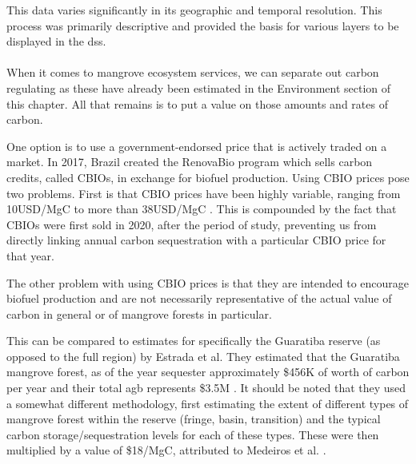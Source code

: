 This data varies significantly in its geographic and temporal resolution. This process was primarily descriptive and provided the basis for various layers to be displayed in the \ac{dss}.

\paragraph{} \leavevmode\newline

When it comes to mangrove ecosystem services, we can separate out carbon regulating as these have already been estimated in the Environment section of this chapter. All that remains is to put a value on those amounts and rates of carbon.

One option is to use a government-endorsed price that is actively traded on a market. In 2017, Brazil created the RenovaBio program which sells carbon credits, called CBIOs, in exchange for biofuel production. Using CBIO prices pose two problems. First is that CBIO prices have been highly variable, ranging from 10USD/MgC \cite{castroBrazilianCarbonCredit2020} to more than 38USD/MgC \cite{barrosBiofuelsAnnual2022}. This is compounded by the fact that CBIOs were first sold in 2020, after the period of study, preventing us from directly linking annual carbon sequestration with a particular CBIO price for that year.

The other problem with using CBIO prices is that they are intended to encourage biofuel production and are not necessarily representative of the actual value of carbon in general or of mangrove forests in particular.   

This can be compared to estimates for specifically the Guaratiba reserve (as opposed to the full region) by Estrada et al. They estimated that the Guaratiba mangrove forest, as of the year  sequester approximately \$456K of worth of carbon per year and their total \ac{agb} represents \$3.5M \cite{estradaEconomicEvaluationCarbon2015}. It should be noted that they used a somewhat different methodology, first estimating the extent of different types of mangrove forest within the reserve (fringe, basin, transition) and the typical carbon storage/sequestration levels for each of these types. These were then multiplied by a value of \$18/MgC, attributed to Medeiros et al. \cite{medeirosContribuicaoUnidadesConservacao2011}. 

